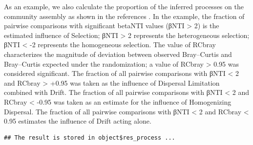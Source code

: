\documentclass[
]{book}
\newenvironment{Shaded}{\begin{snugshade}}{\end{snugshade}}
\newcommand{\AttributeTok}[1]{\textcolor[rgb]{0.77,0.63,0.00}{#1}}
\newcommand{\CommentTok}[1]{\textcolor[rgb]{0.56,0.35,0.01}{\textit{#1}}}
\newcommand{\ConstantTok}[1]{\textcolor[rgb]{0.00,0.00,0.00}{#1}}
\newcommand{\FunctionTok}[1]{\textcolor[rgb]{0.00,0.00,0.00}{#1}}
\newcommand{\NormalTok}[1]{#1}
\newcommand{\SpecialCharTok}[1]{\textcolor[rgb]{0.00,0.00,0.00}{#1}}
\begin{document}
As an example, we also calculate the proportion of the inferred processes on the community assembly as shown in the references \citep{Stegen_Quantifying_2013, Liu_Long_term_2017}.
In the example, the fraction of pairwise comparisons with significant betaNTI values (\textbar βNTI\textbar{} \textgreater{} 2) is the estimated influence of Selection;
βNTI \textgreater{} 2 represents the heterogeneous selection; βNTI \textless{} -2 represents the homogeneous selection.
The value of RCbray characterizes the magnitude of deviation between observed Bray--Curtis and Bray--Curtis expected under the randomization;
a value of \textbar RCbray\textbar{} \textgreater{} 0.95 was considered significant.
The fraction of all pairwise comparisons with \textbar βNTI\textbar{} \textless{} 2 and RCbray \textgreater{} +0.95 was taken as the influence of Dispersal Limitation combined with Drift.
The fraction of all pairwise comparisons with \textbar βNTI\textbar{} \textless{} 2 and RCbray \textless{} -0.95 was taken as an estimate for the influence of Homogenizing Dispersal.
The fraction of all pairwise comparisons with \textbar βNTI\textbar{} \textless{} 2 and \textbar RCbray\textbar{} \textless{} 0.95 estimates the influence of Drift acting alone.

\begin{Shaded}
\end{Shaded}

\begin{verbatim}
## The result is stored in object$res_process ...
\end{verbatim}

\begin{Shaded}
\end{Shaded}

\begin{Shaded}
\end{Shaded}
\end{document}
